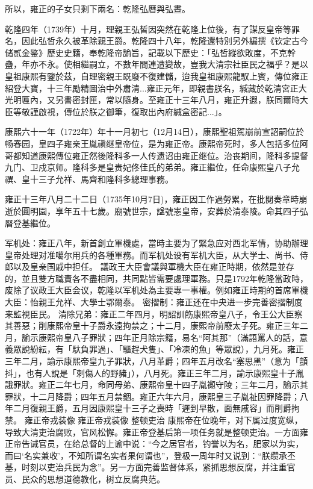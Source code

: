 所以，雍正的子女只剩下兩名：乾隆弘曆與弘晝。

乾隆四年（1739年）十月，理親王弘皙因突然在乾隆上位後，有了謀反皇帝等罪名，因此弘皙永久被革除親王爵。乾隆四十八年，乾隆還特別另外編撰《钦定古今储贰金鉴》歷史史籍，奉乾隆帝諭旨，記載以下歷史：「弘皙縱欲敗度，不克幹蠱，年亦不永。使相繼嗣立，不數年間連遭變故，豈我大清宗社臣民之福乎？是以皇祖康熙有鑒於茲，自理密親王既廢不復建儲，迨我皇祖康熙龍馭上賓，傳位雍正紹登大寶，十三年勵精圖治中外肅清...雍正元年，即親書朕名，緘藏於乾清宮正大光明匾內，又另書密封匣，常以隨身。至雍正十三年八月，雍正升遐，朕同爾時大臣等敬謹啟視，傳位於朕之御筆，復取出內府緘盒密記...」。

康熙六十一年（1722年）年十一月初七（12月14日），康熙聖祖駕崩前宣詔嗣位於畅春园，皇四子雍亲王胤禛继皇帝位，是为雍正帝。康熙帝死时，多人包括多位阿哥都知道康熙傳位雍正然後隆科多一人传遗诏由雍正继位。治丧期间，隆科多提督九门、卫戍京师。隆科多是皇贵妃佟佳氏的弟弟。雍正繼位，任命康熙皇八子允禩、皇十三子允祥、馬齊和隆科多總理事務。

雍正十三年八月二十二日（1735年10月7日)，雍正因工作過勞累，在批閱奏章時崩逝於圓明園，享年五十七歲。廟號世宗，諡號憲皇帝，安葬於清泰陵。命其四子弘曆登基繼位。

军机处：雍正八年，新首創立軍機處，當時主要为了緊急应对西北军情，协助辦理皇帝处理对准噶尔用兵的各種軍務。而军机处设有军机大臣，从大学士、尚书、侍郎以及皇亲国戚中担任。 議政王大臣會議與軍機大臣在雍正時期，依然是並存的，並且雙方職責各不盡相同，共同點皆需要處理軍務。只是1792年乾隆當政時，废除了议政王大臣会议，乾隆以军机处為主要專一事權。例如雍正時期的首席軍機大臣：怡親王允祥、大學士鄂爾泰。
密摺制：雍正还在中央进一步完善密摺制度来監視臣民。
清除兄弟：雍正二年四月，明詔訓飭康熙帝皇八子，令王公大臣察其善惡；削康熙帝皇十子爵永遠拘禁之；十二月，康熙帝前廢太子死。雍正三年二月，諭示康熙帝皇八子罪狀；四年正月除宗籍，易名“阿其那”（滿語罵人的話，意義眾說紛紜，有「馱負罪過」、「驅趕犬隻」、「冷凍的魚」等眾說），九月死。雍正三年二月，諭示康熙帝皇九子罪狀，八月革爵；四年五月改名“塞思黑”（意为「顫抖」，也有人說是「刺傷人的野豬」），八月死。雍正三年二月，諭示康熙皇十子胤誐罪狀。雍正二年七月，命同母弟、康熙帝皇十四子胤禵守陵；三年二月，諭示其罪狀，十二月降爵；四年五月禁錮。雍正六年六月，康熙皇三子胤祉因罪降爵；八年二月復親王爵，五月因康熙皇十三子之喪時「遲到早散，面無戚容」而削爵拘禁。
雍正帝戎装像
雍正帝戎装像
整顿吏治
康熙帝在位晚年，对下属过度宽纵，导致大清吏治腐败，官风松懈。雍正帝登基后第一项任务就是整顿吏治。一方面雍正帝告诫官员，在给总督的上谕中说：“今之居官者，钓誉以为名，肥家以为实，而曰‘名实兼收’，不知所谓名实者果何谓也”，登极一周年时又说到：“朕缵承丕基，时刻以吏治兵民为念”。另一方面完善监督体系，紧抓思想反腐，并注重官员、民众的思想道德教化，树立反腐典范。

